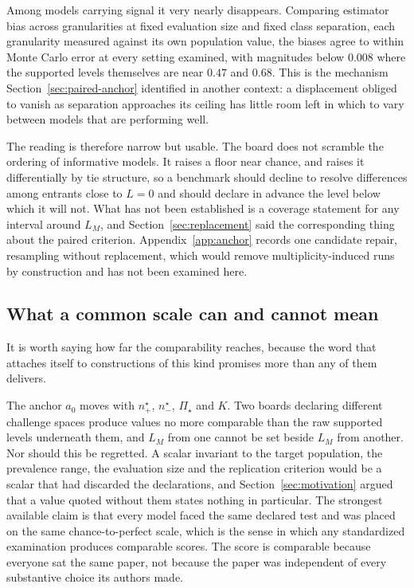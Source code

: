 \documentclass[11pt]{article}
\newcommand{\PSet}{\Pi_\star}
\theoremstyle{remark}
\begin{document}
Among models carrying signal it very nearly disappears. Comparing estimator bias across granularities at fixed evaluation size and fixed class separation, each granularity measured against its own population value, the biases agree to within Monte Carlo error at every setting examined, with magnitudes below $0.008$ where the supported levels themselves are near $0.47$ and $0.68$. This is the mechanism Section~\ref{sec:paired-anchor} identified in another context: a displacement obliged to vanish as separation approaches its ceiling has little room left in which to vary between models that are performing well.

The reading is therefore narrow but usable. The board does not scramble the ordering of informative models. It raises a floor near chance, and raises it differentially by tie structure, so a benchmark should decline to resolve differences among entrants close to $L=0$ and should declare in advance the level below which it will not. What has not been established is a coverage statement for any interval around $L_M$, and Section~\ref{sec:replacement} said the corresponding thing about the paired criterion. Appendix~\ref{app:anchor} records one candidate repair, resampling without replacement, which would remove multiplicity-induced runs by construction and has not been examined here.

\subsection{What a common scale can and cannot mean}
\label{sec:what-universal-means}

It is worth saying how far the comparability reaches, because the word that attaches itself to constructions of this kind promises more than any of them delivers.

The anchor $a_0$ moves with $n^\star_+$, $n^\star_-$, $\PSet$ and $K$. Two boards declaring different challenge spaces produce values no more comparable than the raw supported levels underneath them, and $L_M$ from one cannot be set beside $L_M$ from another. Nor should this be regretted. A scalar invariant to the target population, the prevalence range, the evaluation size and the replication criterion would be a scalar that had discarded the declarations, and Section~\ref{sec:motivation} argued that a value quoted without them states nothing in particular. The strongest available claim is that every model faced the same declared test and was placed on the same chance-to-perfect scale, which is the sense in which any standardized examination produces comparable scores. The score is comparable because everyone sat the same paper, not because the paper was independent of every substantive choice its authors made.
\end{document}
